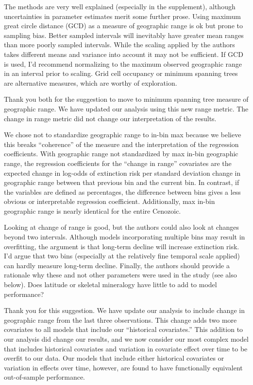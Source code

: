 \documentclass[12pt,letterpaper]{article}
\begin{document}
\begin{refsection}
\begin{bfseries}
  The methods are very well explained (especially in the supplement), although uncertainties in parameter estimates merit some further prose. Using maximum great circle distance (GCD) as a measure of geographic range is ok but prone to sampling bias. Better sampled intervals will inevitably have greater mean ranges than more poorly sampled intervals. While the scaling applied by the authors takes different means and variance into account it may not be sufficient. If GCD is used, I’d recommend normalizing to the maximum observed geographic range in an interval prior to scaling. Grid cell occupancy or minimum spanning trees are alternative measures, which are worthy of exploration. 
\end{bfseries}

Thank you both for the suggestion to move to minimum spanning tree measure of geographic range. We have updated our analysis using this new range metric. The change in range metric did not change our interpretation of the results.

We chose not to standardize geographic range to in-bin max because we believe this breaks ``coherence'' of the measure and the interpretation of the regression coefficients. With geographic range not standardized by max in-bin geographic range, the regression coefficients for the ``change in range'' covariates are the expected change in log-odds of extinction risk per standard deviation change in geographic range between that previous bin and the current bin. In contrast, if the variables are defined as percentages, the difference between bins gives a less obvious or interpretable regression coefficient. Additionally, max in-bin geographic range is nearly identical for the entire Cenozoic.

\begin{bfseries}
  Looking at change of range is good, but the authors could also look at changes beyond two intervals. Although models incorporating multiple bins may result in overfitting, the argument is that long-term decline will increase extinction risk. I’d argue that two bins (especially at the relatively fine temporal scale applied) can hardly measure long-term decline. Finally, the authors should provide a rationale why these and not other parameters were used in the study (see also below). Does latitude or skeletal mineralogy have little to add to model performance?
\end{bfseries}

Thank you for this suggestion. We have update our analysis to include change in geographic range from the last three observations. This change adds two more covariates to all models that include our ``historical covariates.'' This addition to our analysis did change our results, and we now consider our most complex model that includes historical covariates and variation in covariate effect over time to be overfit to our data. Our models that include either historical covariates or variation in effects over time, however, are found to have functionally equivalent out-of-sample performance.


\end{refsection}
\end{document}
